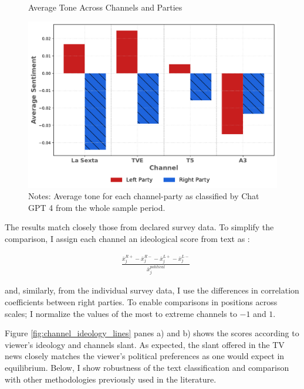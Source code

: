 \documentclass[12pt]{article}
\begin{document}
	

	
	\begin{figure}[ht!]
		\caption{Average Tone Across Channels and Parties}
		\centering
		\includegraphics[width=120mm]{figures/chatgpt}
		\caption*{\small Notes: Average tone for each channel-party as classified by Chat GPT 4 from the whole sample period. }
		\label{fig:chat}
	\end{figure}
	
	The results match closely those from declared survey data. 	To simplify the comparison, I assign each channel an ideological score from text as :
	
	\begin{equation}
		\begin{aligned}
			& \frac{\bar{x}_j^{R+}-\bar{x}_j^{R-}-\bar{x}_j^{L+}-\bar{x}_j^{L-}}{\bar{x}_j^{political}}
		\end{aligned}
		\label{eq:position}
	\end{equation} 
	
	
	and, similarly, from the individual survey data, I use the differences in correlation coefficients between right parties. To enable comparisons in positions across scales; I normalize the values of the most to extreme channels to $-1$ and $1$.
	
	
	Figure \ref{fig:channel_ideology_lines} panes a) and b)  shows the scores according to viewer's ideology and channels slant. As expected, the slant offered in the TV news closely matches the viewer's political preferences as one would expect in equilibrium. Below, I show robustness of the text classification and comparison with other methodologies previously used in the literature. 
	
\end{document}
